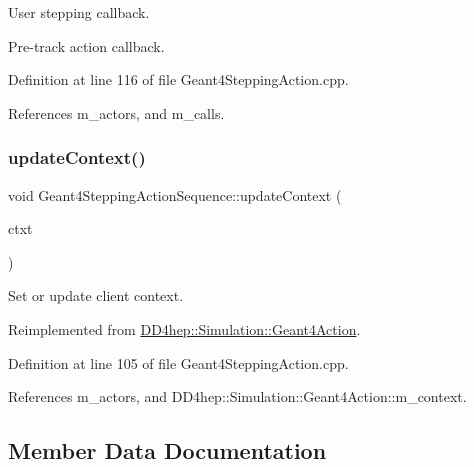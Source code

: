 User stepping callback. 

Pre-\/track action callback. 

Definition at line 116 of file Geant4\+Stepping\+Action.\+cpp.



References m\+\_\+actors, and m\+\_\+calls.

\hypertarget{class_d_d4hep_1_1_simulation_1_1_geant4_stepping_action_sequence_aababd8e6f650101a6ade162f82a29f61}{}\label{class_d_d4hep_1_1_simulation_1_1_geant4_stepping_action_sequence_aababd8e6f650101a6ade162f82a29f61} 
\subsubsection{\texorpdfstring{update\+Context()}{updateContext()}}
{\footnotesize\ttfamily void Geant4\+Stepping\+Action\+Sequence\+::update\+Context (\begin{DoxyParamCaption}\item[{\hyperlink{class_d_d4hep_1_1_simulation_1_1_geant4_context}{Geant4\+Context} $\ast$}]{ctxt }\end{DoxyParamCaption})\hspace{0.3cm}{\ttfamily [virtual]}}



Set or update client context. 



Reimplemented from \hyperlink{class_d_d4hep_1_1_simulation_1_1_geant4_action_ae3b9daf2af881df956c46568c0743313}{D\+D4hep\+::\+Simulation\+::\+Geant4\+Action}.



Definition at line 105 of file Geant4\+Stepping\+Action.\+cpp.



References m\+\_\+actors, and D\+D4hep\+::\+Simulation\+::\+Geant4\+Action\+::m\+\_\+context.



\subsection{Member Data Documentation}
\hypertarget{class_d_d4hep_1_1_simulation_1_1_geant4_stepping_action_sequence_a09eb0634934bffe70733ba62589456c2}{}\label{class_d_d4hep_1_1_simulation_1_1_geant4_stepping_action_sequence_a09eb0634934bffe70733ba62589456c2} 
